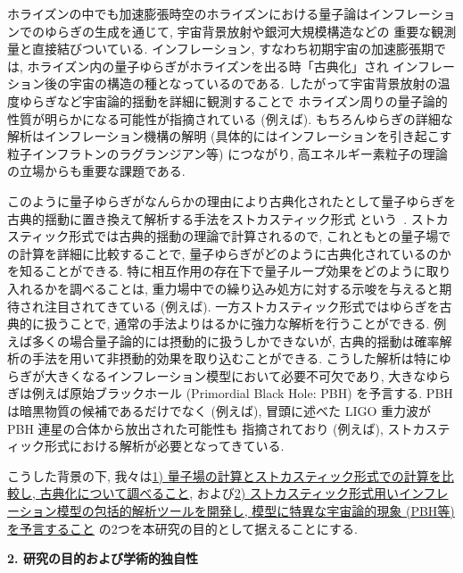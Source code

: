 \documentclass[11pt,a4j,dvipdfmx]{jarticle} 					%
\newcommand{\研究課題名}{\mgfamily\sffamily ストカスティック形式で迫る重力と量子論}
\newcommand{\研究機関名}{\mgfamily\sffamily 名古屋大学}
\newcommand{\研究代表者氏名}{\mgfamily\sffamily 多田祐一郎}
\newcommand{\研究期間の最終元号年度}{34}  %
\begin{document}
ホライズンの中でも加速膨張時空のホライズンにおける量子論はインフレーションでのゆらぎの生成を通じて, 宇宙背景放射や銀河大規模構造などの
重要な観測量と直接結びついている. インフレーション, すなわち初期宇宙の加速膨張期では, ホライズン内の量子ゆらぎがホライズンを出る時「古典化」され
インフレーション後の宇宙の構造の種となっているのである. したがって宇宙背景放射の温度ゆらぎなど宇宙論的揺動を詳細に観測することで
ホライズン周りの量子論的性質が明らかになる可能性が指摘されている (例えば\cite{Maldacena:2015bha}).
もちろんゆらぎの詳細な解析はインフレーション機構の解明 (具体的にはインフレーションを引き起こす粒子インフラトンのラグランジアン等) につながり,
高エネルギー素粒子の理論の立場からも重要な課題である.

このように量子ゆらぎがなんらかの理由により古典化されたとして量子ゆらぎを古典的揺動に置き換えて解析する手法をストカスティック形式
という~\cite{Starobinsky:1986fx}. ストカスティック形式では古典的揺動の理論で計算されるので, これともとの量子場での計算を詳細に比較することで,
量子ゆらぎがどのように古典化されているのかを知ることができる. 特に相互作用の存在下で量子ループ効果をどのように取り入れるかを調べることは,
重力場中での繰り込み処方に対する示唆を与えると期待され注目されてきている (例えば\cite{Tokuda:2017fdh}).
一方ストカスティック形式ではゆらぎを古典的に扱うことで, 通常の手法よりはるかに強力な解析を行うことができる.
例えば多くの場合量子論的には摂動的に扱うしかできないが, 古典的揺動は確率解析の手法を用いて非摂動的効果を取り込むことができる.
こうした解析は特にゆらぎが大きくなるインフレーション模型において必要不可欠であり, 大きなゆらぎは例えば原始ブラックホール (Primordial Black Hole: PBH)
を予言する. PBH は暗黒物質の候補であるだけでなく (例えば\cite{Carr:2016drx}), 冒頭に述べた LIGO 重力波が PBH 連星の合体から放出された可能性も
指摘されており (例えば\cite{Sasaki:2016jop}), ストカスティック形式における解析が必要となってきている.

こうした背景の下, 我々は\ul{1) 量子場の計算とストカスティック形式での計算を比較し,
古典化について調べること}, および\ul{2) ストカスティック形式用いインフレーション模型の包括的解析ツールを開発し, 模型に特異な宇宙論的現象 (PBH等) 
を予言すること} の2つを本研究の目的として据えることにする.



\begin{mdframed}[roundcorner=0.5zw,
	innertopmargin=0.8zw,innerbottommargin=0.8zw,
	linecolor=black!50,linewidth=0.2zw,
	backgroundcolor=black!10]
	{\bfseries\gtfamily\sffamily\large 2. 研究の目的および学術的独自性}
\end{mdframed}
\end{document}
